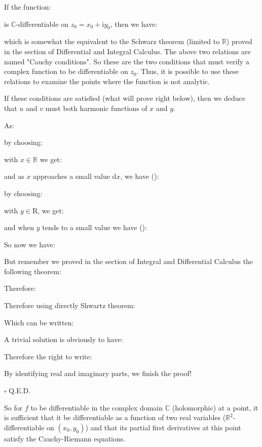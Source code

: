	If the function:
	
	is $\mathbb{C}$-differentiable on $z_0=x_0+\mathrm{i}y_0$, then we have:
	
	which is somewhat the equivalent to the Schwarz theorem (limited to $\mathbb{R}$) proved in the section of Differential and Integral Calculus. The above two relations are named "Cauchy conditions". So these are the two conditions that must verify a complex function to be differentiable on $z_0$. Thus, it is possible to use these relations to examine the points where the function is not analytic.
	
	\begin{theorem}
	If these conditions are satisfied (what will prove right below), then we deduce that $u$ and $v$ must both harmonic functions of $x$ and $y$.
	\end{theorem}
	\begin{dem}
	As:
	
	by choosing:
	
	with $x \in \mathbb{R}$ we get:
	
	and as $x$ approaches a small value $\mathrm{d}x$, we have ():
	
	by choosing:
	
	with $y \in \mathrm{R}$, we get:
	
	and when $y$ tends to a small value we have ():
	
	So now we have:
	
	But remember we proved in the section of Integral and Differential Calculus the following theorem:
	
	Therefore:
	
	Therefore using directly Shwartz theorem:
	
	Which can be written:
	
	A trivial solution is obviously to have:
	
	Therefore the right to write:
	
	By identifying real and imaginary parts, we finish the proof!
	\begin{flushright}
		$\square$  Q.E.D.
	\end{flushright}
	\end{dem}
	So for $f$ to be differentiable in the complex domain $\mathbb{C}$ (holomorphic) at a point, it is sufficient that it be differentiable as a function of two real variables ($\mathbb{R}^2$-differentiable on $(x_0,y_0)$) and that its partial first derivatives at this point satisfy the Cauchy-Riemann equations.
	
